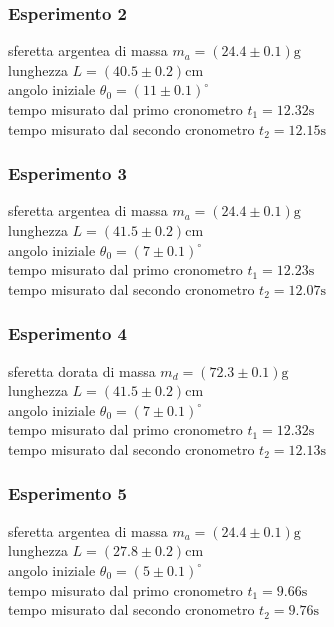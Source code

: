 \documentclass{article}
\begin{document}
\subsubsection{Esperimento 2}
sferetta argentea di massa $m_a = (24.4 \pm 0.1) \mathrm{g}$\\
lunghezza $L = (40.5 \pm 0.2) \mathrm{cm}$\\
angolo iniziale $\theta_0 = (11 \pm 0.1)^{\circ}$\\
tempo misurato dal primo cronometro $t_1 = 12.32 \mathrm{s}$\\
tempo misurato dal secondo cronometro $t_2 = 12.15 \mathrm{s}$

\subsubsection{Esperimento 3}
sferetta argentea di massa $m_a = (24.4 \pm 0.1) \mathrm{g}$\\
lunghezza $L = (41.5 \pm 0.2) \mathrm{cm}$\\
angolo iniziale $\theta_0 = (7 \pm 0.1)^{\circ}$\\
tempo misurato dal primo cronometro $t_1 = 12.23 \mathrm{s}$\\
tempo misurato dal secondo cronometro $t_2 = 12.07 \mathrm{s}$

\subsubsection{Esperimento 4}
sferetta dorata di massa $m_d = (72.3 \pm 0.1) \mathrm{g}$\\
lunghezza $L = (41.5 \pm 0.2) \mathrm{cm}$\\
angolo iniziale $\theta_0 = (7 \pm 0.1)^{\circ}$\\
tempo misurato dal primo cronometro $t_1 = 12.32 \mathrm{s}$\\
tempo misurato dal secondo cronometro $t_2 = 12.13 \mathrm{s}$

\subsubsection{Esperimento 5}
sferetta argentea di massa $m_a = (24.4 \pm 0.1) \mathrm{g}$\\
lunghezza $L = (27.8 \pm 0.2) \mathrm{cm}$\\
angolo iniziale $\theta_0 = (5 \pm 0.1)^{\circ}$\\
tempo misurato dal primo cronometro $t_1 = 9.66 \mathrm{s}$\\
tempo misurato dal secondo cronometro $t_2 = 9.76 \mathrm{s}$\\\\
\end{document}
